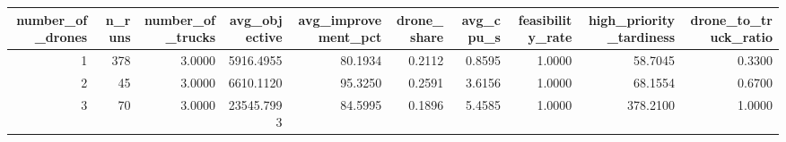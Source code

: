 \begin{tabular}{rrrrrrrrrr}
\toprule
number_of_drones & n_runs & number_of_trucks & avg_objective & avg_improvement_pct & drone_share & avg_cpu_s & feasibility_rate & high_priority_tardiness & drone_to_truck_ratio \\
\midrule
1 & 378 & 3.0000 & 5916.4955 & 80.1934 & 0.2112 & 0.8595 & 1.0000 & 58.7045 & 0.3300 \\
2 & 45 & 3.0000 & 6610.1120 & 95.3250 & 0.2591 & 3.6156 & 1.0000 & 68.1554 & 0.6700 \\
3 & 70 & 3.0000 & 23545.7993 & 84.5995 & 0.1896 & 5.4585 & 1.0000 & 378.2100 & 1.0000 \\
\bottomrule
\end{tabular}
